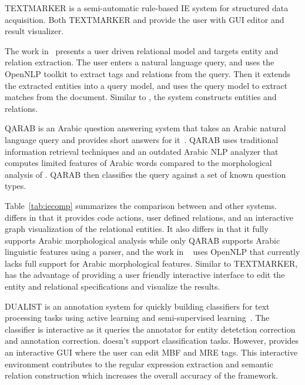 TEXTMARKER is a semi-automatic rule-based IE system 
for structured data acquisition\cite{atzmueller2008rule}.
Both TEXTMARKER and \framework provide the user with GUI editor and result visualizer. 

The work in~\cite{urbain2012user} presents a user 
driven relational model and targets entity and relation extraction. 
The user enters a natural language query, and uses the OpenNLP toolkit to 
extract tags and relations from the query. 
Then it extends the extracted entities into a query model,
and uses the query model to extract matches from the document. 
Similar to \framework, the system constructs entities and relations. 

QARAB is an Arabic question answering system that 
takes an Arabic natural language query and provides short answers for it~\cite{hammo2002qarab}. 
QARAB uses traditional information retrieval techniques and an outdated Arabic NLP 
analyzer that computes limited features of Arabic words compared 
to the morphological analysis of \framework. 
QARAB then classifies the query against a set of known question types. 

Table~\ref{tab:iecomp} summarizes the comparison between \framework and
other systems. \framework differs in that it provides 
code actions, user defined relations, and an interactive 
graph visualization of the relational entities. 
It also differs in that it fully supports Arabic morphological analysis
while only QARAB supports Arabic linguistic features using a parser, and 
the work in ~\cite{urbain2012user} uses OpenNLP that currently lacks full
support for Arabic morphological features. 
Similar to TEXTMARKER, \framework has the advantage of providing 
a user friendly interactive interface to edit the entity and relational 
specifications and visualize the results. 

DUALIST is an annotation system for quickly building classifiers for 
text processing tasks using active learning and semi-supervised learning~\cite{settles2011closing}. 
The classifier is interactive as it queries the annotator 
for entity detetction correction and annotation correction. 
\framework doesn't support classification tasks. 
However, \framework provides an interactive GUI where the user can edit MBF and MRE tags. 
This interactive environment contributes to the regular expression 
extraction and semantic relation construction which increases the overall accuracy of the framework.

